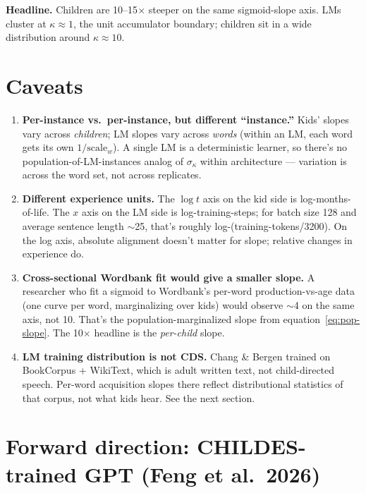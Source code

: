 \documentclass[11pt]{article}
\begin{document}
\textbf{Headline.} Children are 10--15$\times$ steeper on the same
sigmoid-slope axis. LMs cluster at $\kappa \approx 1$, the unit
accumulator boundary; children sit in a wide distribution around
$\kappa \approx 10$.

\section{Caveats}

\begin{enumerate}[leftmargin=1.4em]
\item \textbf{Per-instance vs.\ per-instance, but different ``instance.''}
Kids' slopes vary across \emph{children}; LM slopes vary across
\emph{words} (within an LM, each word gets its own $1/\text{scale}_w$).
A single LM is a deterministic learner, so there's no
population-of-LM-instances analog of $\sigma_\kappa$ within architecture
--- variation is across the word set, not across replicates.

\item \textbf{Different experience units.} The $\log t$ axis on the kid
side is log-months-of-life. The $x$ axis on the LM side is
log-training-steps; for batch size 128 and average sentence length
$\sim$25, that's roughly log-(training-tokens/3200). On the log axis,
absolute alignment doesn't matter for slope; relative changes in
experience do.

\item \textbf{Cross-sectional Wordbank fit would give a smaller slope.}
A researcher who fit a sigmoid to Wordbank's per-word
production-vs-age data (one curve per word, marginalizing over kids)
would observe $\sim$4 on the same axis, not 10. That's the
population-marginalized slope from
equation~\eqref{eq:pop-slope}. The 10$\times$ headline is the
\emph{per-child} slope.

\item \textbf{LM training distribution is not CDS.} Chang \& Bergen
trained on BookCorpus + WikiText, which is adult written text, not
child-directed speech. Per-word acquisition slopes there reflect
distributional statistics of that corpus, not what kids hear. See
the next section.
\end{enumerate}

\section{Forward direction: CHILDES-trained GPT (Feng et al.\ 2026)}
\end{document}
